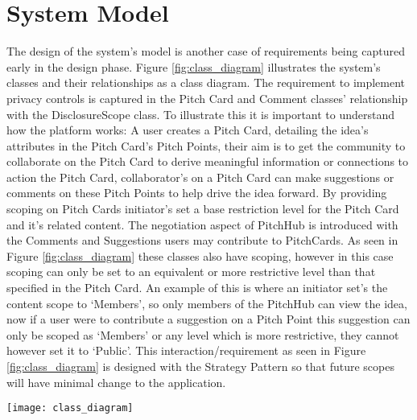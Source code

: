 \section{System Model}\label{S:systemModel}

The design of the system's model is another case of requirements being captured early in the design phase. Figure \ref{fig:class_diagram} illustrates the system's classes and their relationships as a class diagram. The requirement to implement privacy controls is captured in the Pitch Card and Comment classes' relationship with the DisclosureScope class. To illustrate this it is important to understand how the platform works: A user creates a Pitch Card, detailing the idea's attributes in the Pitch Card's Pitch Points, their aim is to get the community to collaborate on the Pitch Card to derive meaningful information or connections to action the Pitch Card, collaborator's on a Pitch Card can make suggestions or comments on these Pitch Points to help drive the idea forward. By providing scoping on Pitch Cards initiator's set a base restriction level for the Pitch Card and it's related content. The negotiation aspect of PitchHub is introduced with the Comments and Suggestions users may contribute to PitchCards. As seen in Figure \ref{fig:class_diagram} these classes also have scoping, however in this case scoping can only be set to an equivalent or more restrictive level than that specified in the Pitch Card. An example of this is where an initiator set's the content scope to `Members', so only members of the PitchHub can view the idea, now if a user were to contribute a suggestion on a Pitch Point this suggestion can only be scoped as `Members' or any level which is more restrictive, they cannot however set it to `Public'. This interaction/requirement as seen in Figure \ref{fig:class_diagram} is designed with the Strategy Pattern so that future scopes will have minimal change to the application.
 
\begin{sidewaysfigure}[ht]
    \centering
    \texttt{[image: class\_diagram]}
    \caption{PitchHub's system structure as represented in a class diagram. Of note is the Pitch Card and Comment classes and their relationship to the DisclosureScopes. This relationship describes the Pitch Card and Comment classes ability to scope the visibility of their content. (NB: Some attributes were left out for the sake of brevity e.g. Pitch Cards have an `images' attribute)}
    \label{fig:class_diagram}
\end{sidewaysfigure}

